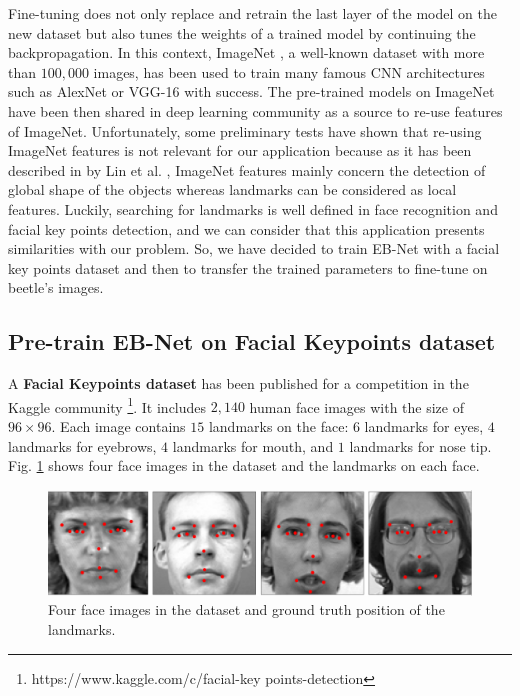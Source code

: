 \documentclass[review]{elsarticle}
\begin{document}
Fine-tuning does not only replace and retrain the last layer of the model on
the new dataset but also tunes the weights of a trained model by
continuing the backpropagation. In this context, ImageNet
\cite{imagenet_cvpr09}, a well-known dataset with more than $100,000 $
images, has been used to train many famous CNN architectures such as
AlexNet \cite{krizhevsky2012imagenet} or VGG-16
\cite{simonyan2014very} with success. The pre-trained models on
ImageNet have been then shared in deep learning community as a source
to re-use features of ImageNet. Unfortunately, some preliminary tests
have shown that re-using ImageNet features is not relevant for our
application because as it has been described in by Lin et
al. \cite{lin2016homemade}, ImageNet features mainly concern the
detection of global shape of the objects whereas landmarks can be
considered as local features. Luckily, searching for landmarks is
well defined in face recognition and facial key points detection, and 
we can consider that this application presents similarities with our problem. So,
we have decided to train EB-Net with a facial key points dataset and
then to transfer the trained parameters to fine-tune on beetle's
images.

\subsection{Pre-train EB-Net on Facial Keypoints dataset}
A \textbf{Facial Keypoints dataset} has been published for a
competition in the  Kaggle
community \footnote{https://www.kaggle.com/c/facial-key
  points-detection}. It includes $2,140$ human face images with the
size of $96 \times 96$. Each image contains $15$ landmarks on the
face: $6$ landmarks for eyes, $4$ landmarks for eyebrows, $4$
landmarks for mouth, and $1$ landmarks for nose
tip. Fig. \ref{figaface} shows four face images in the dataset and the
landmarks on each face.

\begin{figure}[htbp]
	\centerline{\includegraphics[scale=0.16]{images/face_dataset_2.png}}
	\caption{Four face images in the dataset and ground truth position of the landmarks.}
	\label{figaface}
\end{figure}
\end{document}
